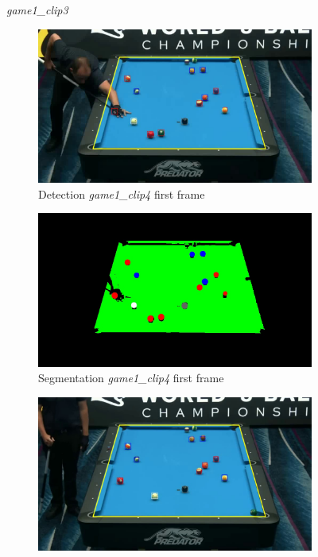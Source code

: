 \begin{figure}[H]
	\caption{\textit{game1\_clip3}}
\end{figure}

\begin{figure}[H]
	\centering
	\begin{subfigure}[b]{0.48\textwidth}
		\centering
		\includegraphics[width=\textwidth]{images/Detection/game1_clip4_detected_balls_first_frame.jpg}
		\caption{Detection \textit{game1\_clip4} first frame}
		\label{fig: game1_clip4_first_frame_detected}
	\end{subfigure}
	\begin{subfigure}[b]{0.48\textwidth}
		\centering
		\includegraphics[width=\textwidth]{images/Segmentation/game1_clip4_segmented_balls_first_frame.jpg}
		\caption{Segmentation \textit{game1\_clip4} first frame}
		\label{fig: game1_clip4_first_frame_segmented}
	\end{subfigure}
	\begin{subfigure}[b]{0.48\textwidth}
		\centering
		\includegraphics[width=\textwidth]{images/Detection/game1_clip4_detected_balls_last_frame.jpg}

\end{subfigure}
\end{figure}
